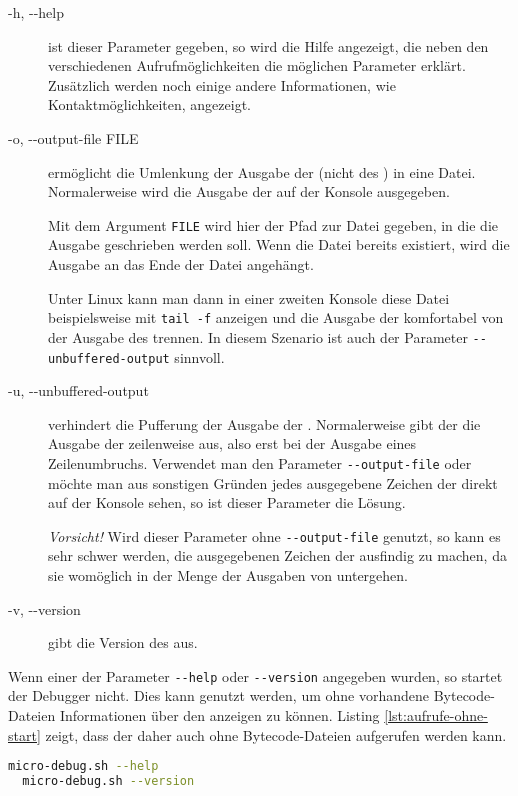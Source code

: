 \begin{description}
\item[-h, -{}-help]
  ist dieser Parameter gegeben, so wird die Hilfe angezeigt, die neben den verschiedenen Aufrufmöglichkeiten die möglichen Parameter erklärt. Zusätzlich werden noch einige andere Informationen, wie Kontaktmöglichkeiten, angezeigt.

\item[-o, -{}-output-file FILE]
  ermöglicht die Umlenkung der Ausgabe der \mic{} (nicht des \md{}) in eine Datei. Normalerweise wird die Ausgabe der \mic{} auf der Konsole ausgegeben.

  Mit dem Argument \texttt{FILE} wird hier der Pfad zur Datei gegeben, in die die Ausgabe geschrieben werden soll. Wenn die Datei bereits existiert, wird die Ausgabe an das Ende der Datei angehängt.

  Unter Linux kann man dann in einer zweiten Konsole diese Datei beispielsweise mit \texttt{tail -f} anzeigen und die Ausgabe der \mic{} komfortabel von der Ausgabe des \md{} trennen. In diesem Szenario ist auch der Parameter \texttt{-{}-unbuffered-output} sinnvoll.
\item[-u, -{}-unbuffered-output]
  verhindert die Pufferung der Ausgabe der \mic{}. Normalerweise gibt der \md{} die Ausgabe der \mic{} zeilenweise aus, also erst bei der Ausgabe eines Zeilenumbruchs. Verwendet man den Parameter \texttt{-{}-output-file} oder möchte man aus sonstigen Gründen jedes ausgegebene Zeichen der \mic{} direkt auf der Konsole sehen, so ist dieser Parameter die Lösung.

  \emph{Vorsicht!} Wird dieser Parameter ohne \texttt{-{}-output-file} genutzt, so kann es sehr schwer werden, die ausgegebenen Zeichen der \mic{} ausfindig zu machen, da sie womöglich in der Menge der Ausgaben von \md{} untergehen.

\item[-v, -{}-version]
  gibt die Version des \md{} aus.
\end{description}

Wenn einer der Parameter \texttt{-{}-help} oder \texttt{-{}-version} angegeben wurden, so startet der Debugger nicht. Dies kann genutzt werden, um ohne vorhandene Bytecode-Dateien Informationen über den \md{} anzeigen zu können. Listing \ref{lst:aufrufe-ohne-start} zeigt, dass der \md{} daher auch ohne Bytecode-Dateien aufgerufen werden kann.

\begin{lstlisting}[language=sh,caption={Aufruf des \md{} ohne Start -- Konsolenversion},label=lst:aufrufe-ohne-start]
  micro-debug.sh --help
  micro-debug.sh --version
\end{lstlisting}

